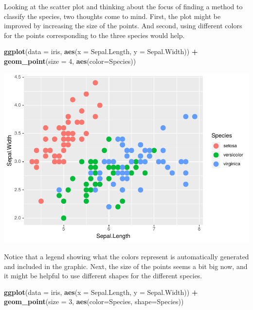 \documentclass[
]{krantz}
\makeatletter
\newenvironment{Shaded}{\begin{snugshade}}{\end{snugshade}}
\newcommand{\DataTypeTok}[1]{\textcolor[rgb]{0.27,0.27,0.27}{#1}}
\newcommand{\DecValTok}[1]{\textcolor[rgb]{0.06,0.06,0.06}{#1}}
\newcommand{\KeywordTok}[1]{\textcolor[rgb]{0.27,0.27,0.27}{\textbf{#1}}}
\newcommand{\NormalTok}[1]{#1}
\newcommand{\OperatorTok}[1]{\textcolor[rgb]{0.43,0.43,0.43}{\textbf{#1}}}
\newcommand{\StringTok}[1]{\textcolor[rgb]{0.5,0.5,0.5}{#1}}
\newenvironment{kframe}{%
\medskip{}
\setlength{\fboxsep}{.8em}
 \def\at@end@of@kframe{}%
 \ifinner\ifhmode%
  \def\at@end@of@kframe{\end{minipage}}%
  \begin{minipage}{\columnwidth}%
 \fi\fi%
 \def\FrameCommand##1{\hskip\@totalleftmargin \hskip-\fboxsep
 \colorbox{shadecolor}{##1}\hskip-\fboxsep
     \hskip-\linewidth \hskip-\@totalleftmargin \hskip\columnwidth}%
 \MakeFramed {\advance\hsize-\width
   \@totalleftmargin\z@ \linewidth\hsize
   \@setminipage}}%
 {\par\unskip\endMakeFramed%
 \at@end@of@kframe}
\renewenvironment{Shaded}{\begin{kframe}}{\end{kframe}}
\makeatother
\begin{document}
Looking at the scatter plot and thinking about the focus of finding a method to classify the species, two thoughts come to mind. First, the plot might be improved by increasing the size of the points. And second, using different colors for the points corresponding to the three species would help.

\begin{Shaded}
\begin{Highlighting}[]
\KeywordTok{ggplot}\NormalTok{(}\DataTypeTok{data =}\NormalTok{ iris, }\KeywordTok{aes}\NormalTok{(}\DataTypeTok{x =}\NormalTok{ Sepal.Length, }\DataTypeTok{y =}\NormalTok{ Sepal.Width)) }\OperatorTok{+}\StringTok{ }
\StringTok{    }\KeywordTok{geom\_point}\NormalTok{(}\DataTypeTok{size =} \DecValTok{4}\NormalTok{, }\KeywordTok{aes}\NormalTok{(}\DataTypeTok{color=}\NormalTok{Species))}
\end{Highlighting}
\end{Shaded}

\includegraphics{bookdown_files/figure-latex/unnamed-chunk-59-1.pdf}

Notice that a legend showing what the colors represent is automatically generated and included in the graphic. Next, the size of the points seems a bit big now, and it might be helpful to use different shapes for the different species.

\begin{Shaded}
\begin{Highlighting}[]
\KeywordTok{ggplot}\NormalTok{(}\DataTypeTok{data =}\NormalTok{ iris, }\KeywordTok{aes}\NormalTok{(}\DataTypeTok{x =}\NormalTok{ Sepal.Length, }\DataTypeTok{y =}\NormalTok{ Sepal.Width)) }\OperatorTok{+}\StringTok{ }
\StringTok{    }\KeywordTok{geom\_point}\NormalTok{(}\DataTypeTok{size =} \DecValTok{3}\NormalTok{, }\KeywordTok{aes}\NormalTok{(}\DataTypeTok{color=}\NormalTok{Species, }\DataTypeTok{shape=}\NormalTok{Species))}
\end{Highlighting}
\end{Shaded}
\end{document}
